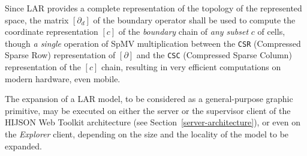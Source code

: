Since LAR provides a complete representation of the topology of the represented space,
the matrix $[\partial_d]$ of the boundary operator shall be used to compute the coordinate representation $[c]$ of the \emph{boundary} chain of \emph{any subset} $c$ of cells, though \emph{a single} operation of SpMV multiplication \cite{gemmexp} between the \texttt{CSR} (Compressed Sparse Row) representation of $[\partial]$ and the \texttt{CSC} (Compressed Sparse Column) representation of the $[c]$ chain, resulting in very efficient computations on modern hardware, even mobile.

The expansion of a LAR model, to be considered as a general-purpose graphic primitive, may be executed on either the server or the supervisor client of the HIJSON Web Toolkit architecture (see Section~\ref{server-architecture}), or even on the \emph{Explorer} client, depending on the size and the locality of the model to be expanded.


